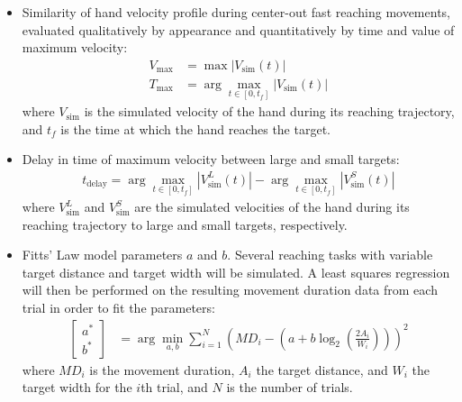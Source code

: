 \documentclass[letterpaper, 10pt, conference]{ieeeconf}
\begin{document}
\begin{itemize}
    \item Similarity of hand velocity profile during center-out fast reaching movements, evaluated qualitatively by appearance and quantitatively by time and value of maximum velocity:
    \begin{align}
        V_{\text{max}} &= \max \left|V_{\text{sim}}(t)\right| \\
        T_{\text{max}} &= \arg\max_{t \in [0, t_f]} \left|V_{\text{sim}}(t)\right|
    \end{align}
    where $V_{\text{sim}}$ is the simulated velocity of the hand during its reaching trajectory, and $t_f$ is the time at which the hand reaches the target.

    \item Delay in time of maximum velocity between large and small targets:
    \begin{multline}
        t_{\text{delay}} = \arg\max_{t \in [0, t_f]} \left|V_{\text{sim}}^{L}(t)\right| - \arg\max_{t \in [0, t_f]} \left|V_{\text{sim}}^{S}(t)\right|
    \end{multline}
    where $V_{\text{sim}}^{L}$ and $V_{\text{sim}}^{S}$ are the simulated velocities of the hand during its reaching trajectory to large and small targets, respectively.
    \item Fitts' Law model parameters $a$ and $b$.
    Several reaching tasks with variable target distance and target width will be simulated. A least squares regression will then be performed on the resulting movement duration data from each trial in order to fit the parameters:
    \begin{align}
        \begin{bmatrix}
            a^* \\ b^*
        \end{bmatrix} &= \arg\min_{a, b} \sum_{i=1}^N \left(MD_i - \left(a + b \log_2\left(\frac{2A_i}{W_i}\right)\right)\right)^2
    \end{align}
    where $MD_i$ is the movement duration, $A_i$ the target distance, and $W_i$ the target width for the $i$th trial, and $N$ is the number of trials.
\end{itemize}
\end{document}
